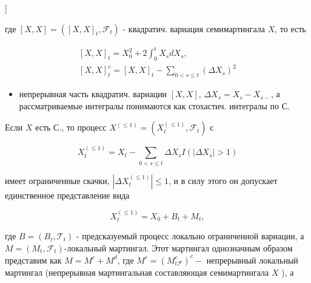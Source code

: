 \documentclass[10pt]{article}
\begin{document}
]



где $[X, X]=\left([X, X]_{t}, \mathscr{F}_{t}\right)$ - квадратич. вариация семимартингала $X$, то есть



\[

\begin{gathered}

{[X, X]_{t}=X_{0}^{2}+2 \int_{0}^{t} X_{s} d X_{s},} \\

{[X, X]_{t}^{c}=[X, X]_{t}-\sum_{0<s \leqslant t}\left(\Delta X_{s}\right)^{2}}

\end{gathered}

\]



\begin{itemize}

  \item непрерывная часть квадратич. вариации $[X, X]$, $\Delta X_{s}=X_{s}-X_{s-}$, а рассматриваемые интегралы понимаются как стохастич. интегралы по С.

\end{itemize}



Если $X$ есть С., то процесс $X^{(\leqslant 1)}=\left(X_{t}^{(\leqslant 1)}, \mathscr{F}_{t}\right)$ с



\[

X_{t}^{(\leqslant 1)}=X_{t}-\sum_{0<s \leqslant t} \Delta X_{s} I\left(\left|\Delta X_{s}\right|>1\right)

\]



имеет ограниченные скачки, $\left|\Delta X_{t}^{(\leqslant 1)}\right| \leqslant 1$, и в силу этого он допускает единственное представление вида



\[

X_{t}^{(\leqslant 1)}=X_{0}+B_{t}+M_{t},

\]



где $B=\left(B_{t}, \mathscr{T}_{t}\right)$ - предсказуемый процесс локально ограниченной вариации, а $M=\left(M_{t}, \mathscr{F}_{t}\right)$-локальный мартингал. Этот мартингал однозначным образом представим как $M=M^{c}+M^{d}$, где $M^{c}=\left(M_{t \mathscr{F}}^{c}\right)^{c}-$ непрерывный локальный мартингал (непрерывная мартингальная составляющая семимартингала $X$ ), а
\end{document}
